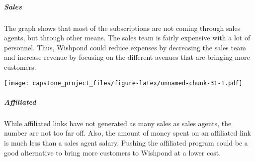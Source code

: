\documentclass[]{article}
\newenvironment{Shaded}{\begin{snugshade}}{\end{snugshade}}
\newcommand{\KeywordTok}[1]{\textcolor[rgb]{0.13,0.29,0.53}{\textbf{#1}}}
\newcommand{\DataTypeTok}[1]{\textcolor[rgb]{0.13,0.29,0.53}{#1}}
\newcommand{\StringTok}[1]{\textcolor[rgb]{0.31,0.60,0.02}{#1}}
\newcommand{\OperatorTok}[1]{\textcolor[rgb]{0.81,0.36,0.00}{\textbf{#1}}}
\newcommand{\NormalTok}[1]{#1}
\let\oldsubparagraph\subparagraph
\renewcommand{\subparagraph}[1]{\oldsubparagraph{#1}\mbox{}}
\begin{document}
\subparagraph{Sales}\label{sales}

The graph shows that most of the subscriptions are not coming through
sales agents, but through other means. The sales team is fairly
expensive with a lot of personnel. Thus, Wishpond could reduce expenses
by decreasing the sales team and increase revenue by focusing on the
different avenues that are bringing more customers.

\begin{Shaded}
\end{Shaded}

\texttt{[image: capstone\_project\_files/figure-latex/unnamed-chunk-31-1.pdf]}

\subparagraph{Affiliated}\label{affiliated}

While affiliated links have not generated as many sales as sales agents,
the number are not too far off. Also, the amount of money spent on an
affiliated link is much less than a sales agent salary. Pushing the
affiliated program could be a good alternative to bring more customers
to Wishpond at a lower cost.

\begin{Shaded}
\end{Shaded}
\end{document}
